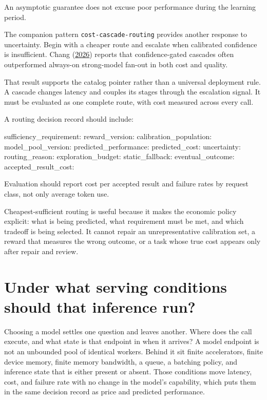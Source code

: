 An asymptotic guarantee does not excuse poor performance during the learning period.

The companion pattern \texttt{cost-cascade-routing} provides another response to uncertainty. Begin with a cheaper route and escalate when calibrated confidence is insufficient. Chang (\href{https://arxiv.org/abs/2604.12262}{2026}) reports that confidence-gated cascades often outperformed always-on strong-model fan-out in both cost and quality.

That result supports the catalog pointer rather than a universal deployment rule. A cascade changes latency and couples its stages through the escalation signal. It must be evaluated as one complete route, with cost measured across every call.

A routing decision record should include:

\begin{record}
\begin{recordbody}
sufficiency_requirement:
reward_version:
calibration_population:
model_pool_version:
predicted_performance:
predicted_cost:
uncertainty:
routing_reason:
exploration_budget:
static_fallback:
eventual_outcome:
accepted_result_cost:
\end{recordbody}
\end{record}

Evaluation should report cost per accepted result and failure rates by request class, not only average token use.

Cheapest-sufficient routing is useful because it makes the economic policy explicit: what is being predicted, what requirement must be met, and which tradeoff is being selected. It cannot repair an unrepresentative calibration set, a reward that measures the wrong outcome, or a task whose true cost appears only after repair and review.

\hypertarget{under-what-serving-conditions-should-that-inference-run}{%
\section{Under what serving conditions should that inference run?}\label{under-what-serving-conditions-should-that-inference-run}}

Choosing a model settles one question and leaves another. Where does the call execute, and what state is that endpoint in when it arrives? A model endpoint is not an unbounded pool of identical workers. Behind it sit finite accelerators, finite device memory, finite memory bandwidth, a queue, a batching policy, and inference state that is either present or absent. Those conditions move latency, cost, and failure rate with no change in the model's capability, which puts them in the same decision record as price and predicted performance.


